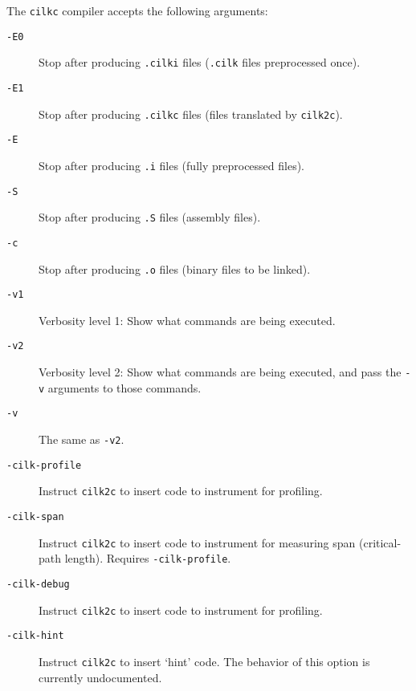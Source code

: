 The \texttt{cilkc} compiler accepts the following arguments:
\begin{description}
\item[\texttt{-E0}\\] Stop after producing \texttt{.cilki} files
(\texttt{.cilk} files preprocessed once).

\item[\texttt{-E1}\\] Stop after producing \texttt{.cilkc} files
(files translated by \texttt{cilk2c}).

\item[\texttt{-E}\\] Stop after producing \texttt{.i} files (fully
preprocessed files).

\item[\texttt{-S}\\] Stop after producing \texttt{.S} files (assembly
files).

\item[\texttt{-c}\\] Stop after producing \texttt{.o} files (binary
files to be linked).

\item[\texttt{-v1}\\] Verbosity level 1: Show what commands are being
executed.

\item[\texttt{-v2}\\] Verbosity level 2: Show what commands are being
executed, and pass the \texttt{-v} arguments to those commands.

\item[\texttt{-v}\\] The same as \texttt{-v2}.

\item[\texttt{-cilk-profile}\\] Instruct \texttt{cilk2c} to insert
code to instrument for profiling.

\item[\texttt{-cilk-span}\\] Instruct \texttt{cilk2c} to
insert code to instrument for measuring span (critical-path length).
Requires \texttt{-cilk-profile}.

\item[\texttt{-cilk-debug}\\] Instruct \texttt{cilk2c} to insert code
to instrument for profiling.

\item[\texttt{-cilk-hint}\\] Instruct \texttt{cilk2c} to insert `hint'
code.  The behavior of this option is currently undocumented.


\end{description}
